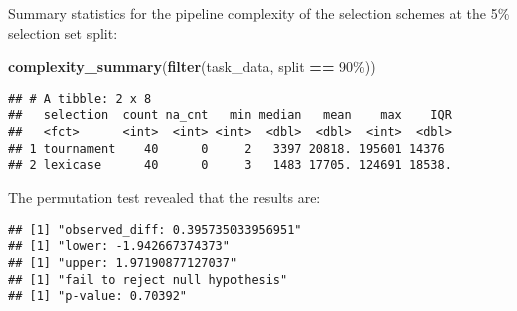 \documentclass[
]{book}
\newenvironment{Shaded}{\begin{snugshade}}{\end{snugshade}}
\newcommand{\AttributeTok}[1]{\textcolor[rgb]{0.13,0.29,0.53}{#1}}
\newcommand{\DecValTok}[1]{\textcolor[rgb]{0.00,0.00,0.81}{#1}}
\newcommand{\FunctionTok}[1]{\textcolor[rgb]{0.13,0.29,0.53}{\textbf{#1}}}
\newcommand{\NormalTok}[1]{#1}
\newcommand{\OtherTok}[1]{\textcolor[rgb]{0.56,0.35,0.01}{#1}}
\newcommand{\SpecialCharTok}[1]{\textcolor[rgb]{0.81,0.36,0.00}{\textbf{#1}}}
\newcommand{\StringTok}[1]{\textcolor[rgb]{0.31,0.60,0.02}{#1}}
\begin{document}
Summary statistics for the pipeline complexity of the selection schemes at the 5\% selection set split:

\begin{Shaded}
\begin{Highlighting}[]
\FunctionTok{complexity\_summary}\NormalTok{(}\FunctionTok{filter}\NormalTok{(task\_data, split }\SpecialCharTok{==} \StringTok{\textquotesingle{}90\%\textquotesingle{}}\NormalTok{))}
\end{Highlighting}
\end{Shaded}

\begin{verbatim}
## # A tibble: 2 x 8
##   selection  count na_cnt   min median   mean    max    IQR
##   <fct>      <int>  <int> <int>  <dbl>  <dbl>  <int>  <dbl>
## 1 tournament    40      0     2   3397 20818. 195601 14376 
## 2 lexicase      40      0     3   1483 17705. 124691 18538.
\end{verbatim}

The permutation test revealed that the results are:

\begin{Shaded}
\end{Shaded}

\begin{verbatim}
## [1] "observed_diff: 0.395735033956951"
## [1] "lower: -1.942667374373"
## [1] "upper: 1.97190877127037"
## [1] "fail to reject null hypothesis"
## [1] "p-value: 0.70392"
\end{verbatim}
\end{document}
